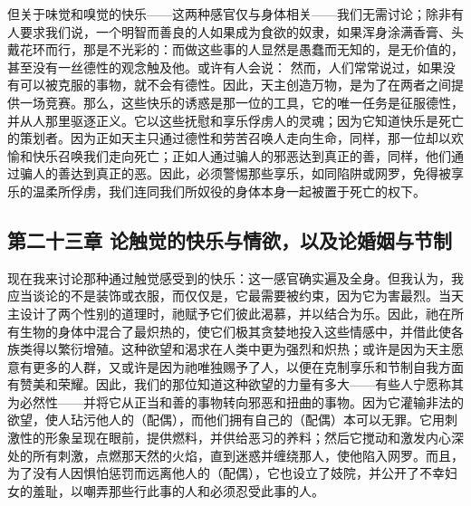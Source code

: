 但关于味觉和嗅觉的快乐——这两种感官仅与身体相关——我们无需讨论；除非有人要求我们说，一个明智而善良的人如果成为食欲的奴隶，如果浑身涂满香膏、头戴花环而行，那是不光彩的：而做这些事的人显然是愚蠢而无知的，是无价值的，甚至没有一丝德性的观念触及他。或许有人会说： 然而，人们常常说过，如果没有可以被克服的事物，就不会有德性。因此，天主创造万物，是为了在两者之间提供一场竞赛。那么，这些快乐的诱惑是那一位的工具，它的唯一任务是征服德性，并从人那里驱逐正义。它以这些抚慰和享乐俘虏人的灵魂；因为它知道快乐是死亡的策划者。因为正如天主只通过德性和劳苦召唤人走向生命，同样，那一位却以欢愉和快乐召唤我们走向死亡；正如人通过骗人的邪恶达到真正的善，同样，他们通过骗人的善达到真正的恶。因此，必须警惕那些享乐，如同陷阱或网罗，免得被享乐的温柔所俘虏，我们连同我们所奴役的身体本身一起被置于死亡的权下。\par


\subsection{第二十三章 论触觉的快乐与情欲，以及论婚姻与节制}

现在我来讨论那种通过触觉感受到的快乐：这一感官确实遍及全身。但我认为，我应当谈论的不是装饰或衣服，而仅仅是，它最需要被约束，因为它为害最烈。当天主设计了两个性别的道理时，祂赋予它们彼此渴慕，并以结合为乐。因此，祂在所有生物的身体中混合了最炽热的，使它们极其贪婪地投入这些情感中，并借此使各族类得以繁衍增殖。这种欲望和渴求在人类中更为强烈和炽热；或许是因为天主愿意有更多的人群，又或许是因为祂唯独赐予了人，以便在克制享乐和节制自我方面有赞美和荣耀。因此，我们的那位知道这种欲望的力量有多大——有些人宁愿称其为必然性——并将它从正当和善的事物转向邪恶和扭曲的事物。因为它灌输非法的欲望，使人玷污他人的（配偶），而他们拥有自己的（配偶）本可以无罪。它用刺激性的形象呈现在眼前，提供燃料，并供给恶习的养料；然后它搅动和激发内心深处的所有刺激，点燃那天然的火焰，直到迷惑并缠绕那人，使他陷入网罗。而且，为了没有人因惧怕惩罚而远离他人的（配偶），它也设立了妓院，并公开了不幸妇女的羞耻，以嘲弄那些行此事的人和必须忍受此事的人。\par

